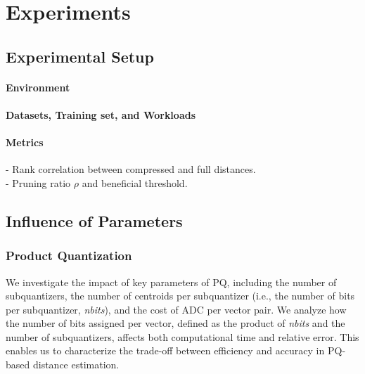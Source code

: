 \documentclass[sigconf]{acmart}
\begin{document}



\section{Experiments}
\subsection{Experimental Setup}
\paragraph{Environment}

\paragraph{Datasets, Training set, and Workloads}

\paragraph{Metrics}
- Rank correlation between compressed and full distances. \\
- Pruning ratio $\rho$ and beneficial threshold.

\subsection{Influence of Parameters}
\subsubsection{Product Quantization} We investigate the impact of key parameters of PQ, including the number of subquantizers, the number of centroids per subquantizer (i.e., the number of bits per subquantizer, \textit{nbits}), and the cost of ADC per vector pair. 
We analyze how the number of bits assigned per vector, defined as the product of \textit{nbits} and the number of subquantizers, affects both computational time and relative error. 
This enables us to characterize the trade-off between efficiency and accuracy in PQ-based distance estimation.
\end{document}
